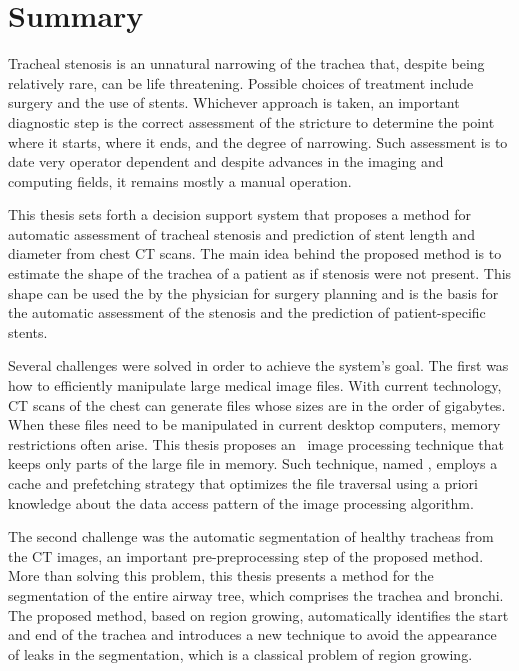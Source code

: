 \chapter*{Summary}

Tracheal stenosis is an unnatural narrowing of the trachea that, despite being relatively rare, can be life threatening. Possible choices of treatment include surgery and the use of stents. Whichever approach is taken, an important diagnostic step is the correct assessment of the stricture to determine the point where it starts, where it ends, and the degree of narrowing. Such assessment is to date very operator dependent and despite advances in the imaging and computing fields, it remains mostly a manual operation.

\medskip

This thesis sets forth a decision support system that proposes a method for automatic assessment of tracheal stenosis and prediction of stent length and diameter from chest CT scans. The main idea behind the proposed method is to estimate the shape of the trachea of a patient as if stenosis were not present. This shape can be used the by the physician for surgery planning and is the basis for the automatic assessment of the stenosis and the prediction of patient-specific stents. 

\medskip

Several challenges were solved in order to achieve the system's goal. The first was how to efficiently manipulate large medical image files. With current technology, CT scans of the chest can generate files whose sizes are in the order of gigabytes. When these files need to be manipulated in current desktop computers, memory restrictions often arise. This thesis proposes an \outcore\ image processing technique that keeps only parts of the large file in memory. Such technique, named \wincache, employs a cache and prefetching strategy that optimizes the file traversal using a priori knowledge about the data access pattern of the image processing algorithm.

\medskip

The second challenge was the automatic segmentation of healthy tracheas from the CT images, an important pre-preprocessing step of the proposed method. More than solving this problem, this thesis presents a method for the segmentation of the entire airway tree, which comprises the trachea and bronchi. The proposed method, based on region growing, automatically identifies the start and end of the trachea and introduces a new technique to avoid the appearance of leaks in the segmentation, which is a classical problem of region growing.


